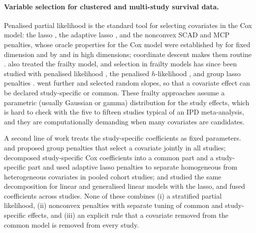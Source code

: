 \documentclass[11pt]{article}
\theoremstyle{remark}
\numberwithin{equation}{section}
\begin{document}
\paragraph{Variable selection for clustered and multi-study survival data.}
Penalised partial likelihood is the standard tool for selecting covariates in
the Cox model: the lasso \citep{Tibshirani1997}, the adaptive lasso
\citep{ZhangLu2007}, and the nonconvex SCAD \citep{Fan2001} and MCP
\citep{Zhang2010} penalties, whose oracle properties for the Cox model were
established by \citet{Fan2002} for fixed dimension and by
\citet{Bradic2011} and \citet{Huang2013} in high dimensions; coordinate descent
makes them routine \citep{Simon2011, Breheny2011}. \citet{Fan2002} also treated
the frailty model, and selection in frailty models has since been studied with
penalised likelihood \citep{Androulakis2012}, the penalised $h$-likelihood
\citep{Ha2014}, and group lasso penalties \citep{Utazirubanda2021}.
\citet{Groll2017} went further and selected random slopes, so that a covariate
effect can be declared study-specific or common. These frailty approaches
assume a parametric (usually Gaussian or gamma) distribution for the study
effects, which is hard to check with the five to fifteen studies typical of an
IPD meta-analysis, and they are computationally demanding when many covariates
are candidates.

A second line of work treats the study-specific coefficients as fixed
parameters. \citet{Ma2011} and \citet{He2016} proposed group penalties that
select a covariate jointly in all studies; \citet{Cheng2015} decomposed
study-specific Cox coefficients into a common part and a study-specific part
and used adaptive lasso penalties to separate homogeneous from heterogeneous
covariates in pooled cohort studies; \citet{GrossTibshirani2016} and
\citet{OllierViallon2017} studied the same decomposition for linear and
generalised linear models with the lasso, and \citet{TangSong2016} fused
coefficients across studies. None of these combines (i) a stratified partial
likelihood, (ii) nonconvex penalties with separate tuning of common and
study-specific effects, and (iii) an explicit rule that a covariate removed
from the common model is removed from every study.
\end{document}
